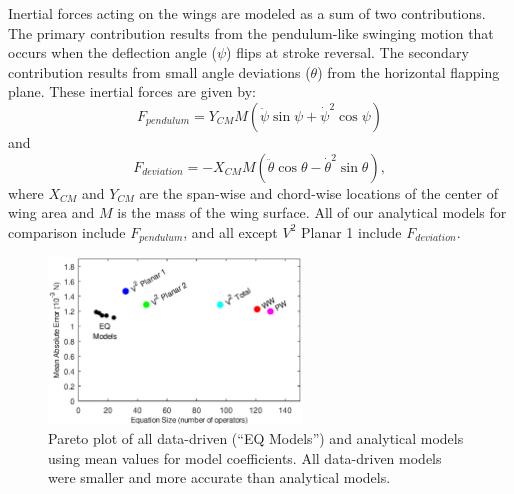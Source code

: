 \documentclass{article}
\begin{document}
Inertial forces acting on the wings are modeled as a sum of two contributions.
The primary contribution results from the pendulum-like swinging motion that
occurs when the deflection angle ($\psi$) flips at stroke reversal.  The
secondary contribution results from small angle deviations ($\theta$) from the horizontal
flapping plane. These inertial forces are given by:
\begin{equation}\label{sdbla}
F_{pendulum} = Y_{CM}M(\ddot{\psi}\sin\psi + \dot{\psi}^2\cos\psi)
\end{equation}
and
\begin{equation}\label{sdbla2}
F_{deviation} = -X_{CM}M(\ddot{\theta}\cos\theta - \dot{\theta}^2\sin\theta),
\end{equation}
\noindent where \(X_{CM}\) and \(Y_{CM}\) are the span-wise and chord-wise
locations of the center of wing area and \(M\) is the mass of the wing surface.
All of our analytical models for comparison include $F_{pendulum}$, and all
except $V^2$ Planar 1 include $F_{deviation}$.

\begin{figure}
\centering
\includegraphics[width=0.6\textwidth]{figures/mae_nofit}
\caption{Pareto plot of all data-driven (``EQ Models'') and analytical models
  using mean values for model coefficients. All data-driven models were smaller
  and more accurate than analytical models.\label{fig:pareto_mae}}
\end{figure}
\end{document}
